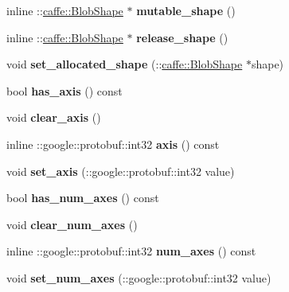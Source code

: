 \begin{DoxyCompactItemize}
\item 
\mbox{\label{classcaffe_1_1_reshape_parameter_a9158b42882482e4d88182a6cc0c1f9b3}} 
inline \+::\mbox{\hyperlink{classcaffe_1_1_blob_shape}{caffe\+::\+Blob\+Shape}} $\ast$ {\bfseries mutable\+\_\+shape} ()
\item 
\mbox{\label{classcaffe_1_1_reshape_parameter_a722149f48ce521238ad5d34428945fa5}} 
inline \+::\mbox{\hyperlink{classcaffe_1_1_blob_shape}{caffe\+::\+Blob\+Shape}} $\ast$ {\bfseries release\+\_\+shape} ()
\item 
\mbox{\label{classcaffe_1_1_reshape_parameter_ad5f67572231d39d0ef50bd199624ef38}} 
void {\bfseries set\+\_\+allocated\+\_\+shape} (\+::\mbox{\hyperlink{classcaffe_1_1_blob_shape}{caffe\+::\+Blob\+Shape}} $\ast$shape)
\item 
\mbox{\label{classcaffe_1_1_reshape_parameter_a0ed62ad72f2769d4ef80e62886e7b903}} 
bool {\bfseries has\+\_\+axis} () const
\item 
\mbox{\label{classcaffe_1_1_reshape_parameter_a3176f3187066a7029bf5ee156afd85c9}} 
void {\bfseries clear\+\_\+axis} ()
\item 
\mbox{\label{classcaffe_1_1_reshape_parameter_aac207e2357f5c72f15b0cc6805f40caf}} 
inline \+::google\+::protobuf\+::int32 {\bfseries axis} () const
\item 
\mbox{\label{classcaffe_1_1_reshape_parameter_a50e0d4404026882e20a92bc20394c668}} 
void {\bfseries set\+\_\+axis} (\+::google\+::protobuf\+::int32 value)
\item 
\mbox{\label{classcaffe_1_1_reshape_parameter_a23b9229e97ea10aa2e24f7fab8ca3352}} 
bool {\bfseries has\+\_\+num\+\_\+axes} () const
\item 
\mbox{\label{classcaffe_1_1_reshape_parameter_ab4104aa12c7128542582cbf0db7cf864}} 
void {\bfseries clear\+\_\+num\+\_\+axes} ()
\item 
\mbox{\label{classcaffe_1_1_reshape_parameter_a216d8d44edea22366613c08b451cffad}} 
inline \+::google\+::protobuf\+::int32 {\bfseries num\+\_\+axes} () const
\item 
\mbox{\label{classcaffe_1_1_reshape_parameter_ae50770983a6c9098668d6aedc2d28b5d}} 
void {\bfseries set\+\_\+num\+\_\+axes} (\+::google\+::protobuf\+::int32 value)
\end{DoxyCompactItemize}
